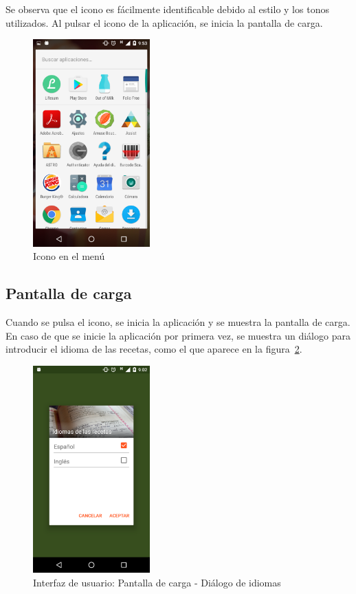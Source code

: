 Se observa que el icono es fácilmente identificable debido al estilo y los
tonos utilizados. Al pulsar el icono de la aplicación, se inicia la pantalla de
carga.

\begin{figure}[htbp]
  \centering
  \includegraphics[width=0.4\textwidth]{cap5/img/captura_menu_02}
  \caption{Icono en el menú}
  \label{fig:captura_menu_02}
\end{figure}


\subsection{Pantalla de carga}

Cuando se pulsa el icono, se inicia la aplicación y se muestra la pantalla de
carga. En caso de que se inicie la aplicación por primera vez, se muestra un
diálogo para introducir el idioma de las recetas, como el que aparece en la
figura~\ref{fig:captura_01}.

\begin{figure}[htbp]
  \centering
  \includegraphics[width=0.4\textwidth]{cap5/img/captura_01}
  \caption{Interfaz de usuario: Pantalla de carga - Diálogo de idiomas}
  \label{fig:captura_01}
\end{figure}

